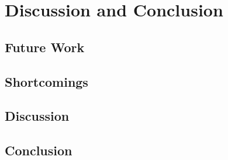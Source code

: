 
\chapter{Discussion and Conclusion}

\section{Future Work}


\section{Shortcomings}

\section{Discussion}



\section{Conclusion}
